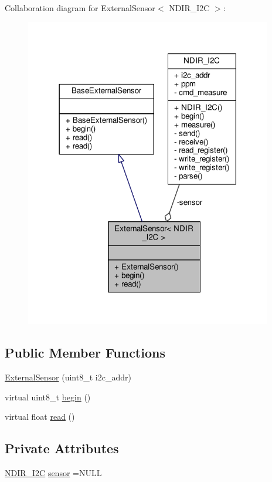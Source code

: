 Collaboration diagram for External\+Sensor$<$ N\+D\+I\+R\+\_\+\+I2C $>$\+:
\nopagebreak
\begin{figure}[H]
\begin{center}
\leavevmode
\includegraphics[width=306pt]{class_external_sensor_3_01_n_d_i_r___i2_c_01_4__coll__graph}
\end{center}
\end{figure}
\subsection*{Public Member Functions}
\begin{DoxyCompactItemize}
\item 
\hyperlink{class_external_sensor_3_01_n_d_i_r___i2_c_01_4_aa06970ea689679c0e1deb5360e05a0a4}{External\+Sensor} (uint8\+\_\+t i2c\+\_\+addr)
\item 
virtual uint8\+\_\+t \hyperlink{class_external_sensor_3_01_n_d_i_r___i2_c_01_4_ac6f3614d94968ef0cc11b2b4d69cef03}{begin} ()
\item 
virtual float \hyperlink{class_external_sensor_3_01_n_d_i_r___i2_c_01_4_a239d18652e9fb4673842ae9726edf44f}{read} ()
\end{DoxyCompactItemize}
\subsection*{Private Attributes}
\begin{DoxyCompactItemize}
\item 
\hyperlink{class_n_d_i_r___i2_c}{N\+D\+I\+R\+\_\+\+I2C} \hyperlink{class_external_sensor_3_01_n_d_i_r___i2_c_01_4_ae541c9cece7c38674b70114cdb74a7dc}{sensor} =N\+U\+LL
\end{DoxyCompactItemize}


